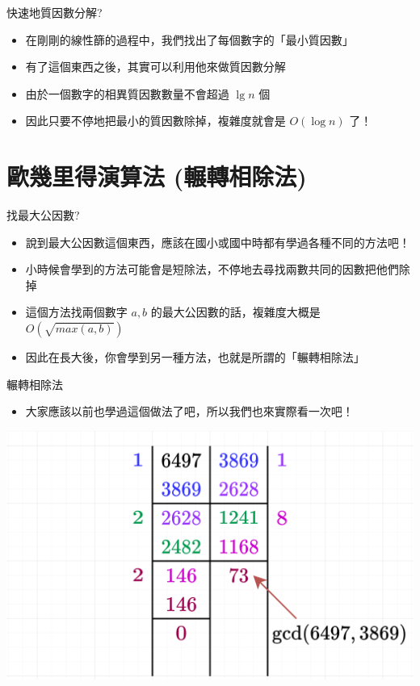 \documentclass[aspectratio=169]{beamer}
\begin{document}
    \begin{frame}{快速地質因數分解?}
        \begin{itemize}
            \item 在剛剛的線性篩的過程中，我們找出了每個數字的「最小質因數」
            \item 有了這個東西之後，其實可以利用他來做質因數分解
            \item 由於一個數字的相異質因數數量不會超過 $\lg n$ 個 
            \item 因此只要不停地把最小的質因數除掉，複雜度就會是 $O(\log n)$ 了！
        \end{itemize}
    \end{frame}
    
    \section{歐幾里得演算法 (輾轉相除法)}
    
    \begin{frame}[fragile]{找最大公因數?}
        \begin{itemize}
            \item 說到最大公因數這個東西，應該在國小或國中時都有學過各種不同的方法吧！
            \item 小時候會學到的方法可能會是短除法，不停地去尋找兩數共同的因數把他們除掉
            \item<2-> 這個方法找兩個數字 $a,b$ 的最大公因數的話，複雜度大概是 $O(\sqrt{max(a,b)})$
            \item<3-> 因此在長大後，你會學到另一種方法，也就是所謂的「輾轉相除法」
        \end{itemize}
    \end{frame}
    
    \begin{frame}{輾轉相除法}
        \begin{itemize}
            \item 大家應該以前也學過這個做法了吧，所以我們也來實際看一次吧！
        \end{itemize}
        \begin{center}
            \includegraphics[scale=0.3]{images/euclidean_algorithm.png}
        \end{center}
    \end{frame}
    
\end{document}
